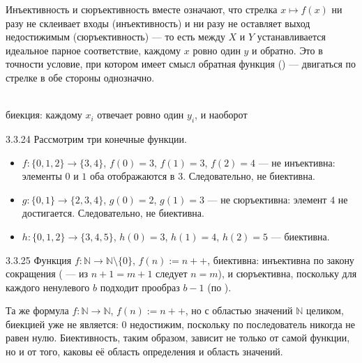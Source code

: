 \begin{intuition}
Инъективность и сюръективность вместе означают, что стрелка $x \mapsto f(x)$ ни разу не
склеивает входы (инъективность) и ни разу не оставляет выход недостижимым (сюръективность) —
то есть между $X$ и $Y$ устанавливается идеальное парное соответствие, каждому $x$ ровно один
$y$ и обратно. Это в точности условие, при котором имеет смысл обратная функция
() — двигаться по стрелке в обе стороны однозначно.

\begin{center}
\\
{\footnotesize\color{intuitiongray}биекция: каждому $x_i$ отвечает ровно один $y_i$, и
наоборот}
\end{center}
\end{intuition}

\begin{example}{3.3.24}{}
Рассмотрим три конечные функции.
\begin{itemize}
  \item $f:\{0,1,2\}\to\{3,4\}$, $f(0)=3$, $f(1)=3$, $f(2)=4$ — не инъективна: элементы $0$ и
        $1$ оба отображаются в $3$. Следовательно, не биективна.
  \item $g:\{0,1\}\to\{2,3,4\}$, $g(0)=2$, $g(1)=3$ — не сюръективна: элемент $4$ не
        достигается. Следовательно, не биективна.
  \item $h:\{0,1,2\}\to\{3,4,5\}$, $h(0)=3$, $h(1)=4$, $h(2)=5$ — биективна.
\end{itemize}
\end{example}

\begin{example}{3.3.25}{}
Функция $f:\mathbb{N}\to\mathbb{N}\setminus\{0\}$, $f(n):=n{+}{+}$, биективна: инъективна по
закону сокращения ( — из $n+1=m+1$ следует $n=m$), и
сюръективна, поскольку для каждого ненулевого $b$ подходит прообраз $b-1$ (по
).

Та же формула $f:\mathbb{N}\to\mathbb{N}$, $f(n):=n{+}{+}$, но с областью значений
$\mathbb{N}$ целиком, биекцией уже не является: $0$ недостижим, поскольку по
 последователь никогда не равен нулю. Биективность, таким
образом, зависит не только от самой функции, но и от того, каковы её область определения и
область значений.
\end{example}


